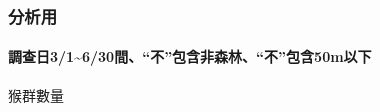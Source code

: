\documentclass[
]{article}
\begin{document}
\newpage

\hypertarget{ux5206ux6790ux7528}{%
\subsubsection{\texorpdfstring{\textbf{分析用}}{分析用}}\label{ux5206ux6790ux7528}}

\hypertarget{ux8abfux67e5ux65e531630ux9593ux4e0dux5305ux542bux975eux68eeux6797ux4e0dux5305ux542b50mux4ee5ux4e0b}{%
\paragraph{\texorpdfstring{\textbf{調查日3/1\textasciitilde6/30間、``不''包含非森林、``不''包含50m以下}}{調查日3/1\textasciitilde6/30間、``不''包含非森林、``不''包含50m以下}}\label{ux8abfux67e5ux65e531630ux9593ux4e0dux5305ux542bux975eux68eeux6797ux4e0dux5305ux542b50mux4ee5ux4e0b}}

猴群數量

\providecommand{\docline}[3]{\noalign{\global\setlength{\arrayrulewidth}{#1}}\arrayrulecolor[HTML]{#2}\cline{#3}}

\setlength{\tabcolsep}{2pt}

\renewcommand*{\arraystretch}{1.5}
\end{document}
